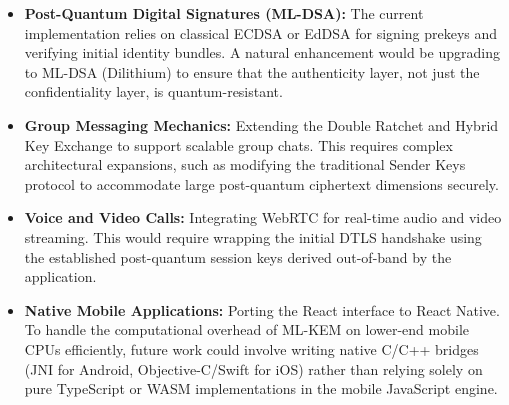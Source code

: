 \begin{itemize}
    \item \textbf{Post-Quantum Digital Signatures (ML-DSA):} The current implementation relies on classical ECDSA or EdDSA for signing prekeys and verifying initial identity bundles. A natural enhancement would be upgrading to ML-DSA (Dilithium) to ensure that the authenticity layer, not just the confidentiality layer, is quantum-resistant.
    \item \textbf{Group Messaging Mechanics:} Extending the Double Ratchet and Hybrid Key Exchange to support scalable group chats. This requires complex architectural expansions, such as modifying the traditional Sender Keys protocol to accommodate large post-quantum ciphertext dimensions securely.
    \item \textbf{Voice and Video Calls:} Integrating WebRTC for real-time audio and video streaming. This would require wrapping the initial DTLS handshake using the established post-quantum session keys derived out-of-band by the application.
    \item \textbf{Native Mobile Applications:} Porting the React interface to React Native. To handle the computational overhead of ML-KEM on lower-end mobile CPUs efficiently, future work could involve writing native C/C++ bridges (JNI for Android, Objective-C/Swift for iOS) rather than relying solely on pure TypeScript or WASM implementations in the mobile JavaScript engine.
\end{itemize}
